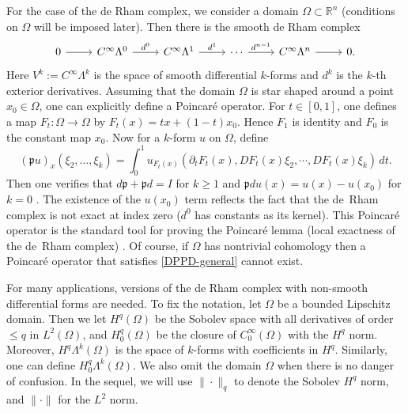 \documentclass[11pt]{amsart}
\newcommand{\0}{\mathaccent23}
\begin{document}
For the case of the de Rham complex, we consider a domain $\Omega\subset\mathbb R^n$ (conditions on $\Omega$ will be imposed later). Then there is the smooth de Rham complex
\begin{equation*}
\begin{tikzcd}
0\arrow{r}& C^{\infty}\Lambda^{0} \arrow{r}{d^{0}}&C^{\infty}\Lambda^{1} \arrow{r}{d^{1}}&\cdots \arrow{r}{d^{n-1}}&C^{\infty}\Lambda^{n}\arrow{r}& 0.
\end{tikzcd}
\end{equation*}
  Here $V^{k}:=C^{\infty}\Lambda^{k}$ is the space of smooth differential $k$-forms and $d^{k}$ is the $k$-th exterior derivatives. Assuming that the domain $\Omega$ is star shaped around a point $x_0\in\Omega$, one can explicitly define a Poincar\'e operator. For $t\in [0,1]$, one defines a map $F_t:\Omega\to\Omega$ by $F_t(x)=tx+(1-t)x_0$. Hence $F_{1}$ is identity and $F_{0}$ is the  constant map $x_{0}$. Now for a $k$-form $u$ on $\Omega$, define 
\begin{equation}\label{smooth-poincare}
(\mathfrak{p} u)_x(\xi_2, \ldots, \xi_k) = \int_0^1 u_{F_t(x)}(\partial_tF_t(x), D F_t(x)\xi_2, \cdots, D F_t(x) \xi_k) \,d t.
\end{equation}
Then one verifies that $d\mathfrak{p}+\mathfrak{p}d=I$ for $k\geq 1$ and $ \mathfrak{p}du(x)=u(x)-u(x_{0})$ for $k=0$ \cite{cartan12701formes,christiansen2018generalized,lang2012fundamentals}. The existence of the $u(x_{0})$ term reflects the fact that the de~Rham complex is not exact at index zero ($d^{0}$ has constants as its kernel). This Poincar\'e operator is the standard tool for proving the Poincar\'e lemma (local exactness of the de~Rham complex) \cite{lang2012fundamentals}. Of course, if $\Omega$ has nontrivial cohomology then a Poincar\'e operator that satisfies \eqref{DPPD-general} cannot exist. 

For many applications, versions of the de Rham complex with non-smooth differential forms are needed. To fix the notation, let $\Omega$ be a bounded Lipschitz domain. Then we let $H^{q}(\Omega)$ be the Sobolev space with all derivatives of order  $\leq q$ in $L^{2}(\Omega)$, and $H_{0}^{q}(\Omega)$ be the closure of $C^{\infty}_{0}(\Omega)$ with the $H^{q}$ norm.    Moreover,  $H^{q}\Lambda^{k}(\Omega)$ is the space of $k$-forms with coefficients in $H^{q}$. Similarly, one can define $H^{q}_{0}\Lambda^{k}(\Omega)$. We also omit the domain $\Omega$ when there is no danger of confusion.  In the sequel, we will use $\|\cdot\|_{q}$ to denote the Sobolev $H^{q}$ norm, and $\|\cdot\|$ for the $L^{2}$ norm.
\end{document}
